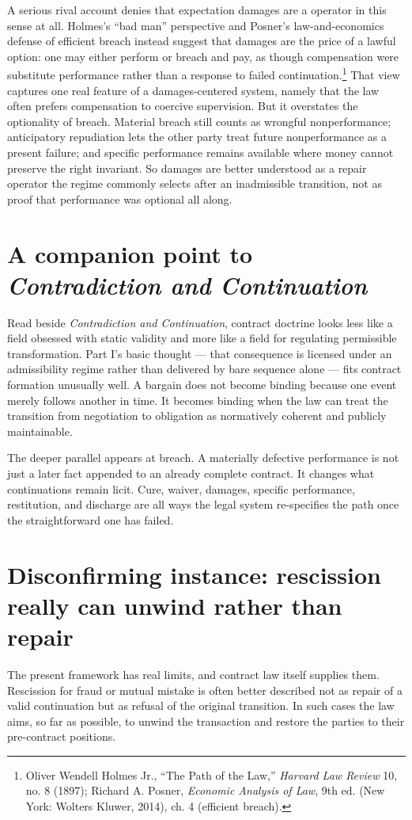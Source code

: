 \documentclass[11pt]{article}
\begin{document}
A serious rival account denies that expectation damages are a \repair{} operator in this sense at all. Holmes's ``bad man'' perspective and Posner's law-and-economics defense of efficient breach instead suggest that damages are the price of a lawful option: one may either perform or breach and pay, as though compensation were substitute performance rather than a response to failed continuation.\footnote{Oliver Wendell Holmes Jr., ``The Path of the Law,'' \emph{Harvard Law Review} 10, no. 8 (1897); Richard A. Posner, \emph{Economic Analysis of Law}, 9th ed. (New York: Wolters Kluwer, 2014), ch. 4 (efficient breach).} That view captures one real feature of a damages-centered system, namely that the law often prefers compensation to coercive supervision. But it overstates the optionality of breach. Material breach still counts as wrongful nonperformance; anticipatory repudiation lets the other party treat future nonperformance as a present failure; and specific performance remains available where money cannot preserve the right invariant. So damages are better understood as a repair operator the regime commonly selects after an inadmissible transition, not as proof that performance was optional all along.

\section{A companion point to \textit{Contradiction and Continuation}}
Read beside \textit{Contradiction and Continuation}, contract doctrine looks less like a field obsessed with static validity and more like a field for regulating permissible transformation. Part I's basic thought --- that consequence is licensed under an admissibility regime rather than delivered by bare sequence alone --- fits contract formation unusually well. A bargain does not become binding because one event merely follows another in time. It becomes binding when the law can treat the transition from negotiation to obligation as normatively coherent and publicly maintainable.

The deeper parallel appears at breach. A materially defective performance is not just a later fact appended to an already complete contract. It changes what continuations remain licit. Cure, waiver, damages, specific performance, restitution, and discharge are all ways the legal system re-specifies the path once the straightforward one has failed.

\section{Disconfirming instance: rescission really can unwind rather than repair}
The present framework has real limits, and contract law itself supplies them. Rescission for fraud or mutual mistake is often better described not as repair of a valid continuation but as refusal of the original transition. In such cases the law aims, so far as possible, to unwind the transaction and restore the parties to their pre-contract positions.
\end{document}
